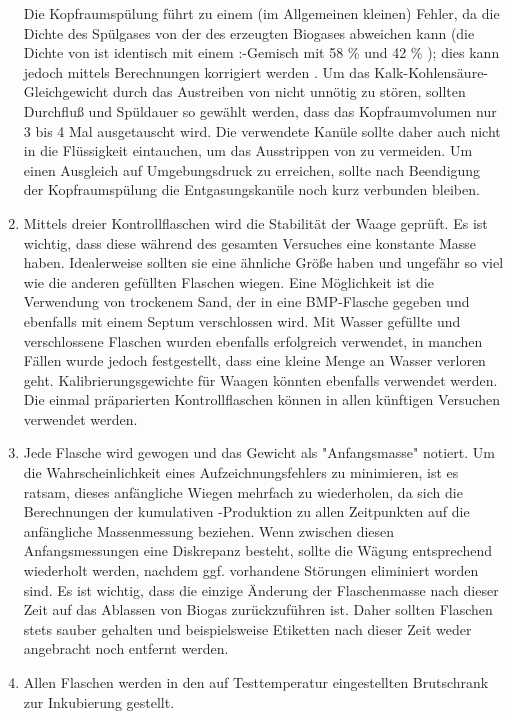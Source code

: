 \documentclass[]{article}
\begin{document}
\begin{enumerate}
{        Die Kopfraumspülung führt zu einem (im Allgemeinen kleinen) Fehler, da die Dichte des Spülgases von der des erzeugten Biogases abweichen kann (die Dichte von  ist identisch mit einem :-Gemisch mit 58 \%  und 42 \% ); dies kann jedoch mittels Berechnungen korrigiert werden \citep{justesenDevelopmentValidationLowcost2019}.
}
      Um das Kalk-Kohlensäure-Gleichgewicht durch das Austreiben von  nicht unnötig zu stören, sollten Durchfluß und Spüldauer so gewählt werden, dass das Kopfraumvolumen nur 3 bis 4 Mal ausgetauscht wird. Die verwendete Kanüle sollte daher auch nicht in die Flüssigkeit eintauchen, um das Ausstrippen von  zu vermeiden. Um einen Ausgleich auf Umgebungsdruck zu erreichen, sollte nach Beendigung der Kopfraumspülung die Entgasungskanüle noch kurz verbunden bleiben.
    \item Mittels dreier Kontrollflaschen wird die Stabilität der Waage geprüft. Es ist wichtig, dass diese während des gesamten Versuches eine konstante Masse haben. 
      Idealerweise sollten sie eine ähnliche Größe haben und ungefähr so viel wie die anderen gefüllten Flaschen wiegen.
      Eine Möglichkeit ist die Verwendung von trockenem Sand, der in eine BMP-Flasche gegeben und ebenfalls mit einem Septum verschlossen wird.
      Mit Wasser gefüllte und verschlossene Flaschen wurden ebenfalls erfolgreich verwendet, in manchen Fällen wurde jedoch festgestellt, dass eine kleine Menge an Wasser verloren geht.
      Kalibrierungsgewichte für Waagen könnten ebenfalls verwendet werden. Die einmal präparierten Kontrollflaschen können in allen künftigen Versuchen verwendet werden.
    \item Jede Flasche wird gewogen und das Gewicht als "Anfangsmasse" notiert.
      Um die Wahrscheinlichkeit eines Aufzeichnungsfehlers zu minimieren, ist es ratsam, dieses anfängliche Wiegen mehrfach zu wiederholen, da sich die Berechnungen der kumulativen -Produktion zu allen Zeitpunkten auf die anfängliche Massenmessung beziehen.
      Wenn zwischen diesen Anfangsmessungen eine Diskrepanz besteht, sollte die Wägung entsprechend wiederholt werden, nachdem ggf. vorhandene Störungen eliminiert worden sind.
      Es ist wichtig, dass die einzige Änderung der Flaschenmasse nach dieser Zeit auf das Ablassen von Biogas zurückzuführen ist.
      Daher sollten Flaschen stets sauber gehalten und beispielsweise Etiketten nach dieser Zeit weder angebracht noch entfernt werden.
    \item Allen Flaschen werden in den auf Testtemperatur eingestellten Brutschrank zur Inkubierung gestellt.
\end{enumerate}
\end{document}
